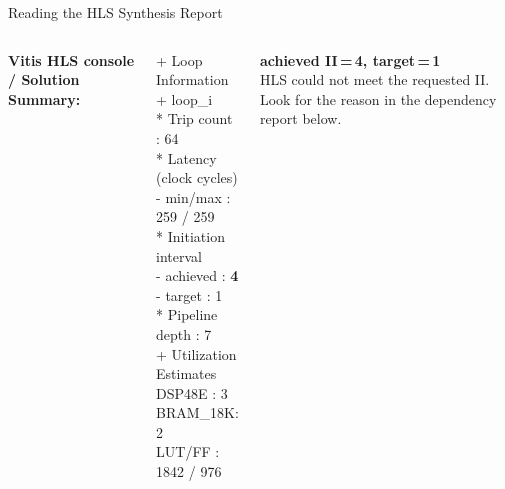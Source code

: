 \documentclass[aspectratio=169,12pt]{beamer}
\begin{document}
\begin{frame}{Reading the HLS Synthesis Report}
\vspace{0.05cm}
\begin{columns}[T,totalwidth=\textwidth]

  {\small\color{Navy}\bfseries Vitis HLS console / Solution Summary:}
  \vspace{3pt}

  \colorbox{NavyDk!6}{\parbox{\dimexpr\linewidth-2\fboxsep\relax}{
  \ttfamily\fontsize{7.5}{10}\selectfont
  \color{NavyDk}
  + Loop Information\\
  \hspace{1em}+ loop\_i\\
  \hspace{2em}* Trip count : 64\\
  \hspace{2em}* Latency (clock cycles)\\
  \hspace{3em}- min/max : 259 / 259\\
  \hspace{2em}* Initiation interval\\
  \hspace{3em}- achieved : \textbf{\color{Orange}4}\\
  \hspace{3em}- target   : 1\\
  \hspace{2em}* Pipeline depth : 7\\[4pt]
  + Utilization Estimates\\
  \hspace{1em}DSP48E  : 3\\
  \hspace{1em}BRAM\_18K: 2\\
  \hspace{1em}LUT/FF  : 1842 / 976
  }}

  \vspace{-0.45cm}

  \colorbox{Orange!10}{\parbox{\dimexpr\linewidth-2\fboxsep\relax}{\vspace{3pt}
    {\color{Orange}\bfseries achieved II\,=\,4, target\,=\,1}\\
    {\small HLS could not meet the requested II. Look for the reason in the dependency report below.}
  \vspace{3pt}}}


\end{columns}
\end{frame}
\end{document}
